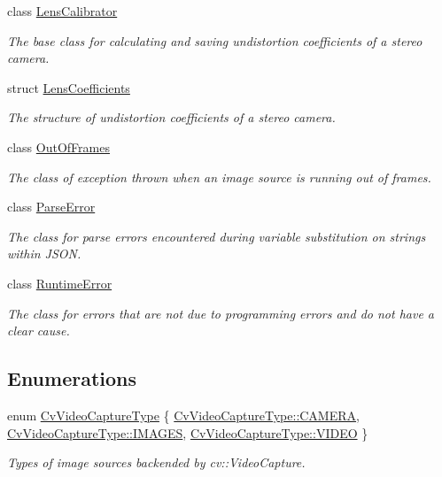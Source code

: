 \begin{DoxyCompactItemize}
class \hyperlink{classstereo__ugv_1_1LensCalibrator}{Lens\+Calibrator}
\begin{DoxyCompactList}\small\item\em The base class for calculating and saving undistortion coefficients of a stereo camera. \end{DoxyCompactList}\item 
struct \hyperlink{structstereo__ugv_1_1LensCoefficients}{Lens\+Coefficients}
\begin{DoxyCompactList}\small\item\em The structure of undistortion coefficients of a stereo camera. \end{DoxyCompactList}\item 
class \hyperlink{classstereo__ugv_1_1OutOfFrames}{Out\+Of\+Frames}
\begin{DoxyCompactList}\small\item\em The class of exception thrown when an image source is running out of frames. \end{DoxyCompactList}\item 
class \hyperlink{classstereo__ugv_1_1ParseError}{Parse\+Error}
\begin{DoxyCompactList}\small\item\em The class for parse errors encountered during variable substitution on strings within J\+S\+ON. \end{DoxyCompactList}\item 
class \hyperlink{classstereo__ugv_1_1RuntimeError}{Runtime\+Error}
\begin{DoxyCompactList}\small\item\em The class for errors that are not due to programming errors and do not have a clear cause. \end{DoxyCompactList}\end{DoxyCompactItemize}
\subsection*{Enumerations}
\begin{DoxyCompactItemize}
\item 
enum \hyperlink{namespacestereo__ugv_a5c139e7cfac12e9270ca903f1ce2e4bc}{Cv\+Video\+Capture\+Type} \{ \hyperlink{namespacestereo__ugv_a5c139e7cfac12e9270ca903f1ce2e4bcaddf0d6b21537d984fea6544f58101fa8}{Cv\+Video\+Capture\+Type\+::\+C\+A\+M\+E\+RA}, 
\hyperlink{namespacestereo__ugv_a5c139e7cfac12e9270ca903f1ce2e4bcab34687a3607271050f02aa9bf90c731a}{Cv\+Video\+Capture\+Type\+::\+I\+M\+A\+G\+ES}, 
\hyperlink{namespacestereo__ugv_a5c139e7cfac12e9270ca903f1ce2e4bcae60ae31f67ab883c746bb71c7a145c18}{Cv\+Video\+Capture\+Type\+::\+V\+I\+D\+EO}
 \}\begin{DoxyCompactList}\small\item\em Types of image sources backended by cv\+::\+Video\+Capture. \end{DoxyCompactList}
\end{DoxyCompactItemize}
